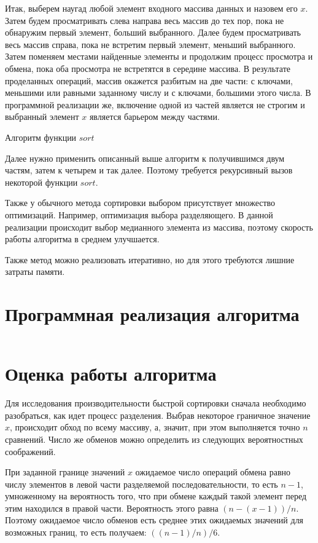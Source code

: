 \documentclass[bachelor, och, labwork]{shiza}
\begin{document}
Итак, выберем наугад любой элемент входного массива данных и назовем его $x$.
Затем будем просматривать слева направа весь массив до тех пор, пока не
обнаружим первый элемент, больший выбранного. Далее будем просматривать весь
массив справа, пока не встретим первый элемент, меньший выбранного.
Затем поменяем местами найденные элементы и продолжим процесс просмотра и обмена,
пока оба просмотра не встретятся в середине массива. В результате 
проделанных операций, массив окажется разбитым на две части: с ключами, меньшими
или равными заданному числу и с ключами, большими этого числа.
В программной реализации же, включение одной из частей является не строгим и 
выбранный элемент $x$ является барьером между частями.

\begin{center}Алгоритм функции $sort$\end{center}

Далее нужно применить описанный выше алгоритм к получившимся двум частям, затем 
к четырем и так далее. Поэтому требуется рекурсивный вызов некоторой функции 
$sort$.

Также у обычного метода сортировки выбором присутствует множество оптимизаций. 
Например, оптимизация выбора разделяющего. В данной реализации происходит выбор 
медианного элемента из массива, поэтому скорость работы алгоритма в среднем 
улучшается.

Также метод можно реализовать итеративно, но для этого требуются лишние затраты
памяти.


\section{Программная реализация алгоритма}

\inputminted[linenos,breaklines=true, fontsize=\small, style=bw]{python}{qs.py}

\section{Оценка работы алгоритма}

Для исследования производительности быстрой сортировки сначала необходимо
разобраться, как идет процесс разделения. Выбрав некоторое граничное значение
$x$, происходит обход по всему массиву, а, значит, при этом выполняется точно
$n$ сравнений. Число же обменов можно определить из следующих
вероятностных соображений.

При заданной границе значений $x$ ожидаемое число операций обмена равно числу 
элементов в левой части разделяемой последовательности, то есть $n-1$,
умноженному на вероятность того, что при обмене каждый такой элемент перед этим
находился в правой части. Вероятность этого равна $(n-(x-1))/n$. Поэтому 
ожидаемое число обменов есть среднее этих ожидаемых значений для возможных
границ, то есть получаем: $((n-1)/n)/6$.
\end{document}
